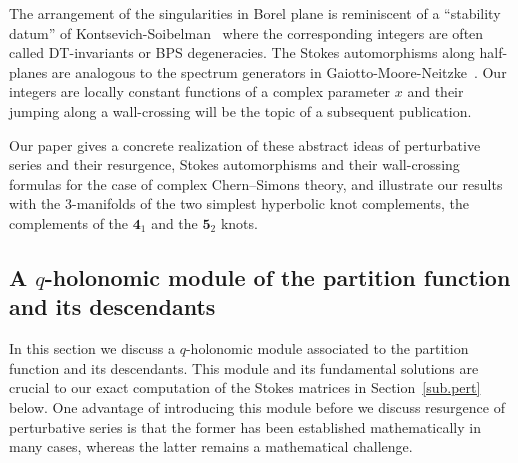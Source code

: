 \documentclass[12pt,reqno]{amsart}
\theoremstyle{definition}
\def\md{\mathbf}
\newcommand{\knot}[1]{\md{#1}}
\begin{document}
The arrangement of the singularities in Borel plane
is reminiscent of a ``stability datum'' of
Kontsevich-Soibelman~\cite{KS,KS:stability, KS:wall-crossing} where the
corresponding integers are often called DT-invariants or BPS degeneracies. 
The Stokes automorphisms along half-planes are analogous to the spectrum
generators in
Gaiotto-Moore-Neitzke~\cite{gmn, gmn2, gmn3}. Our integers are locally
constant functions of a complex parameter $x$ and their jumping along
a wall-crossing will be the topic of a subsequent publication.

Our paper gives a concrete realization of these abstract ideas of
perturbative series and their resurgence, Stokes automorphisms and
their wall-crossing formulas for the case of complex Chern--Simons
theory, and illustrate our results with the 3-manifolds of the two
simplest hyperbolic knot complements, the complements of the
$\knot{4}_1$ and the $\knot{5}_2$ knots.

\subsection{A $q$-holonomic module of the partition function
  and its descendants}
\label{sub.results}

In this section we discuss a $q$-holonomic module associated to the
partition function and its descendants. This module and its
fundamental solutions are crucial to our exact computation of the
Stokes matrices in Section~\ref{sub.pert} below. One advantage of
introducing this module before we discuss resurgence of perturbative
series is that the former has been established mathematically in many
cases, whereas the latter remains a mathematical challenge.
\end{document}
